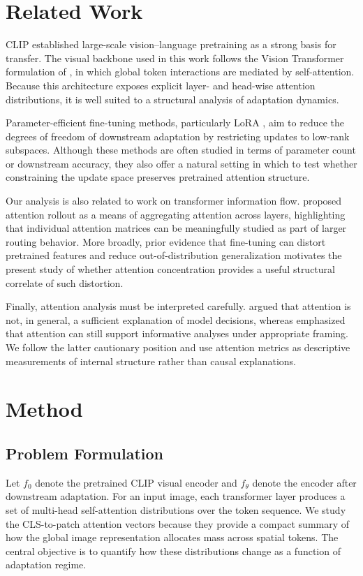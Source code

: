 \documentclass[10pt]{article}
\begin{document}
\section{Related Work}
CLIP \citep{radford2021learning} established large-scale vision--language pretraining as a strong basis for transfer. The visual backbone used in this work follows the Vision Transformer formulation of \citet{dosovitskiy2021image}, in which global token interactions are mediated by self-attention. Because this architecture exposes explicit layer- and head-wise attention distributions, it is well suited to a structural analysis of adaptation dynamics.

Parameter-efficient fine-tuning methods, particularly LoRA \citep{hu2022lora}, aim to reduce the degrees of freedom of downstream adaptation by restricting updates to low-rank subspaces. Although these methods are often studied in terms of parameter count or downstream accuracy, they also offer a natural setting in which to test whether constraining the update space preserves pretrained attention structure.

Our analysis is also related to work on transformer information flow. \citet{abnar2020quantifying} proposed attention rollout as a means of aggregating attention across layers, highlighting that individual attention matrices can be meaningfully studied as part of larger routing behavior. More broadly, prior evidence that fine-tuning can distort pretrained features and reduce out-of-distribution generalization \citep{kumar2022finetuning,wortsman2022robust} motivates the present study of whether attention concentration provides a useful structural correlate of such distortion.

Finally, attention analysis must be interpreted carefully. \citet{jain2019attention} argued that attention is not, in general, a sufficient explanation of model decisions, whereas \citet{wiegreffe2019attention} emphasized that attention can still support informative analyses under appropriate framing. We follow the latter cautionary position and use attention metrics as descriptive measurements of internal structure rather than causal explanations.

\section{Method}
\subsection{Problem Formulation}
Let $f_0$ denote the pretrained CLIP visual encoder and $f_\theta$ denote the encoder after downstream adaptation. For an input image, each transformer layer produces a set of multi-head self-attention distributions over the token sequence. We study the CLS-to-patch attention vectors because they provide a compact summary of how the global image representation allocates mass across spatial tokens. The central objective is to quantify how these distributions change as a function of adaptation regime.
\end{document}
